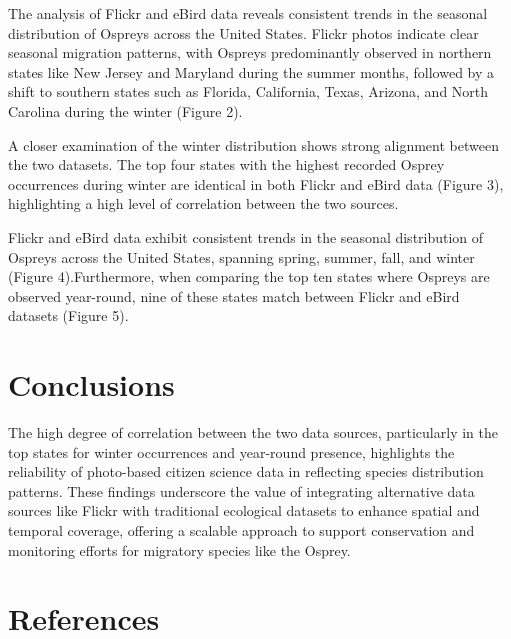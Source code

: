 \documentclass[
  letterpaper,
  DIV=11,
  numbers=noendperiod]{scrartcl}
\begin{document}
The analysis of Flickr and eBird data reveals consistent trends in the
seasonal distribution of Ospreys across the United States. Flickr photos
indicate clear seasonal migration patterns, with Ospreys predominantly
observed in northern states like New Jersey and Maryland during the
summer months, followed by a shift to southern states such as Florida,
California, Texas, Arizona, and North Carolina during the winter (Figure
2).

A closer examination of the winter distribution shows strong alignment
between the two datasets. The top four states with the highest recorded
Osprey occurrences during winter are identical in both Flickr and eBird
data (Figure 3), highlighting a high level of correlation between the
two sources.

Flickr and eBird data exhibit consistent trends in the seasonal
distribution of Ospreys across the United States, spanning spring,
summer, fall, and winter (Figure 4).Furthermore, when comparing the top
ten states where Ospreys are observed year-round, nine of these states
match between Flickr and eBird datasets (Figure 5).

\section{Conclusions}\label{conclusions}

The high degree of correlation between the two data sources,
particularly in the top states for winter occurrences and year-round
presence, highlights the reliability of photo-based citizen science data
in reflecting species distribution patterns. These findings underscore
the value of integrating alternative data sources like Flickr with
traditional ecological datasets to enhance spatial and temporal
coverage, offering a scalable approach to support conservation and
monitoring efforts for migratory species like the Osprey.

\section{References}\label{references}
\end{document}
